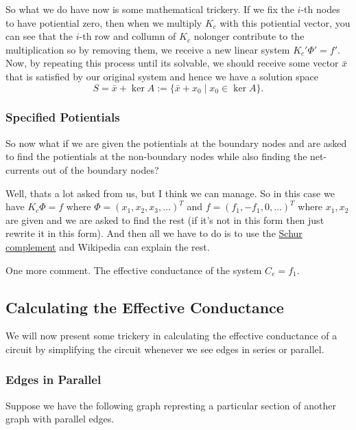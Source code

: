 \documentclass[]{article}
\begin{document}
So what we do have now is some mathematical trickery. If we fix the
\(i\)-th nodes to have potiential zero, then when we multiply \(K_c\)
with this potiential vector, you can see that the \(i\)-th row and
collumn of \(K_c\) nolonger contribute to the multiplication so by
removing them, we receive a new linear system \(K_c' \Phi' = f'\). Now,
by repeating this process until its solvable, we should receive some
vector \(\bar{x}\) that is satisfied by our original system and hence we
have a solution space
\[S = \bar{x} + \ker A := \{\bar{x} + x_0 \mid x_0 \in \ker A \}.\]

\subsubsection{Specified Potientials}\label{specified-potientials}

So now what if we are given the potientials at the boundary nodes and
are asked to find the potientials at the non-boundary nodes while also
finding the net-currents out of the boundary nodes?

Well, thats a lot asked from us, but I think we can manage. So in this
case we have \(K_c \Phi = f\) where \(\Phi = (x_1, x_2, x_3, \dots)^T\)
and \(f = (f_1, -f_1, 0, \dots)^T\) where \(x_1, x_2\) are given and we
are asked to find the rest (if it's not in this form then just rewrite
it in this form). And then all we have to do is to use the
\href{https://en.wikipedia.org/wiki/Schur_complement}{Schur complement}
and Wikipedia can explain the rest.

One more comment. The effective conductance of the system \(C_e = f_1\).

\subsection{Calculating the Effective
Conductance}\label{calculating-the-effective-conductance}

We will now present some trickery in calculating the effective
conductance of a circuit by simplifying the circuit whenever we see
edges in series or parallel.

\subsubsection{Edges in Parallel}\label{edges-in-parallel}

Suppose we have the following graph represting a particular section of
another graph with parallel edges.
\end{document}
